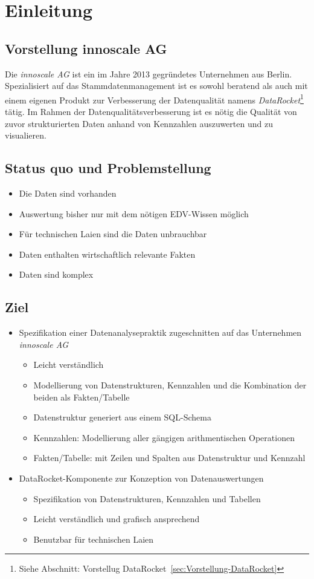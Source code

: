 \chapter{Einleitung}

  \section{Vorstellung innoscale AG}
  Die \textit{innoscale AG} ist ein im Jahre 2013 gegründetes Unternehmen aus
  Berlin.  Spezialisiert auf das Stammdatenmanagement ist es sowohl beratend
  als auch mit einem eigenen Produkt zur Verbesserung der Datenqualität namens
  \textit{DataRocket}\footnote{Siehe Abschnitt: Vorstellug
  DataRocket~\ref{sec:Vorstellung-DataRocket}} tätig. Im Rahmen der
  Datenqualitätsverbesserung ist es nötig die Qualität von zuvor strukturierten
  Daten anhand von Kennzahlen auszuwerten und zu visualieren.

\section{Status quo und Problemstellung}
\begin{itemize}
  \item Die Daten sind vorhanden
  \item Auswertung bisher nur mit dem nötigen EDV-Wissen möglich
  \item Für technischen Laien sind die Daten unbrauchbar
  \item Daten enthalten wirtschaftlich relevante Fakten
  \item Daten sind komplex
\end{itemize}

\section{Ziel}
\begin{itemize}
  \item Spezifikation einer Datenanalysepraktik zugeschnitten auf das
    Unternehmen \textit{innoscale AG}
  \begin{itemize}
    \item Leicht verständlich
    \item Modellierung von Datenstrukturen, Kennzahlen und die Kombination der
      beiden als Fakten/Tabelle
    \item Datenstruktur generiert aus einem SQL-Schema
    \item Kennzahlen: Modellierung aller gängigen arithmentischen Operationen
    \item Fakten/Tabelle: mit Zeilen und Spalten aus Datenstruktur und Kennzahl 
  \end{itemize}
\item DataRocket-Komponente zur Konzeption von Datenauswertungen
  \begin{itemize}
    \item Spezifikation von Datenstrukturen, Kennzahlen und Tabellen
    \item Leicht verständlich und grafisch ansprechend
    \item Benutzbar für technischen Laien
  \end{itemize}
\end{itemize}

